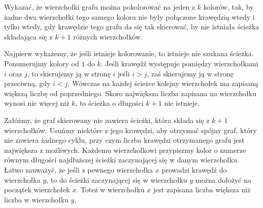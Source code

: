 \begin{problem}{6}
	Wykazać, że wierzchołki grafu można pokolorować na jeden z $k$ kolorów, tak, by żadne dwa wierzchołki tego samego koloru nie były połączone krawędzią wtedy i tylko wtedy, gdy krawędzie tego grafu da się tak skierować, by nie istniała ścieżka składająca się z $k + 1$ różnych wierzchołków.
\end{problem}

\noindent
Najpierw wykażemy, że jeśli istnieje kolorowanie, to istnieje nie szukana ścieżka. Ponumerujmy kolory od $1$ do $k$. Jeśli krawędź występuje pomiędzy wierzchołkami $i$ oraz $j$, to skierujemy ją w stronę $i$ jeśli $i > j$, zaś skierujemy ją w stronę przeciwną, gdy $i < j$. Wówczas na każdej ścieżce kolejny wierzchołek ma zapisaną większą liczbę od poprzedniego. Skoro największa liczba zapisana na wierzchołku wynosi nie więcej niż $k$, to ścieżka o długości $k + 1$ nie istnieje.

\vspace{10px}
\noindent
Załóżmy, że graf skierowany nie zawiera ścieżki, która składa się z $k + 1$ wierzchołków. Usuńmy niektóre z jego krawędzi, aby otrzymać spójny graf, który nie zawiera żadnego cyklu, przy czym liczba krawędzi otrzymanego grafu jest największa z możliwych. Każdemu wierzchołkowi przypiszmy kolor o numerze równym długości najdłuższej ścieżki zaczynającej się w danym wierzchołku. Łatwo zauważyć, że jeśli z pewnego wierzchołka $x$ prowadzi krawędź do wierzchołka $y$, to do ścieżki zaczynającej się w wierzchołku $y$ można dołożyć na początek wierzchołek $x$. Toteż w wierzchołku $x$ jest zapisana liczba większa niż liczba w wierzchołku $y$.

\begin{center}
\end{center}

